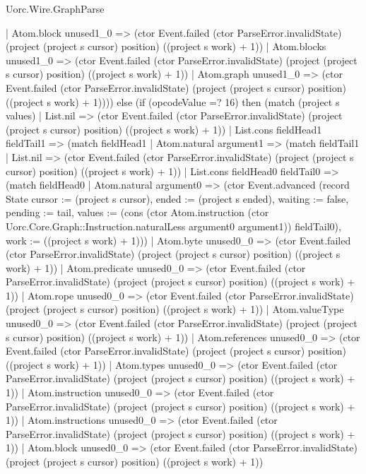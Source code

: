 \begin{lexlean}{Uorc.Wire.GraphParse}
\begin{semanticmodule}
{          | Atom.block unused1_0 => (ctor Event.failed (ctor ParseError.invalidState) (project (project s cursor) position) ((project s work) + 1))
          | Atom.blocks unused1_0 => (ctor Event.failed (ctor ParseError.invalidState) (project (project s cursor) position) ((project s work) + 1))
          | Atom.graph unused1_0 => (ctor Event.failed (ctor ParseError.invalidState) (project (project s cursor) position) ((project s work) + 1)))) else (if (opcodeValue =? 16) then (match (project s values)
        | List.nil => (ctor Event.failed (ctor ParseError.invalidState) (project (project s cursor) position) ((project s work) + 1))
        | List.cons fieldHead1 fieldTail1 => (match fieldHead1
          | Atom.natural argument1 => (match fieldTail1
            | List.nil => (ctor Event.failed (ctor ParseError.invalidState) (project (project s cursor) position) ((project s work) + 1))
            | List.cons fieldHead0 fieldTail0 => (match fieldHead0
              | Atom.natural argument0 => (ctor Event.advanced (record State {cursor := (project s cursor), ended := (project s ended), waiting := false, pending := tail, values := (cons (ctor Atom.instruction (ctor Uorc.Core.Graph::Instruction.naturalLess argument0 argument1)) fieldTail0), work := ((project s work) + 1)}))
              | Atom.byte unused0_0 => (ctor Event.failed (ctor ParseError.invalidState) (project (project s cursor) position) ((project s work) + 1))
              | Atom.predicate unused0_0 => (ctor Event.failed (ctor ParseError.invalidState) (project (project s cursor) position) ((project s work) + 1))
              | Atom.rope unused0_0 => (ctor Event.failed (ctor ParseError.invalidState) (project (project s cursor) position) ((project s work) + 1))
              | Atom.valueType unused0_0 => (ctor Event.failed (ctor ParseError.invalidState) (project (project s cursor) position) ((project s work) + 1))
              | Atom.references unused0_0 => (ctor Event.failed (ctor ParseError.invalidState) (project (project s cursor) position) ((project s work) + 1))
              | Atom.types unused0_0 => (ctor Event.failed (ctor ParseError.invalidState) (project (project s cursor) position) ((project s work) + 1))
              | Atom.instruction unused0_0 => (ctor Event.failed (ctor ParseError.invalidState) (project (project s cursor) position) ((project s work) + 1))
              | Atom.instructions unused0_0 => (ctor Event.failed (ctor ParseError.invalidState) (project (project s cursor) position) ((project s work) + 1))
              | Atom.block unused0_0 => (ctor Event.failed (ctor ParseError.invalidState) (project (project s cursor) position) ((project s work) + 1))
}
\end{semanticmodule}
\end{lexlean}
